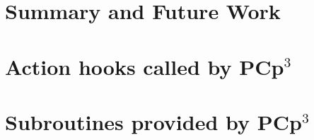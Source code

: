 \documentclass{article}
\newcommand{\pcp}{\mbox{\textsf{PCp}$^3$}}
\begin{document}
\section{Summary and Future Work}
\label{sec:summary}






\appendix
\newpage

\section{Action hooks called by \pcp}
\begin{footnotesize}
\label{sec:hooks}
\begin{itemize}
\sloppy

\fussy
\end{itemize}
\end{footnotesize}

\newpage

\section{Subroutines provided by \pcp}
\label{sec:backcalls}
\begin{footnotesize}
\begin{itemize}
\sloppy

\fussy
\end{itemize}
\end{footnotesize}

\newpage

\nocite{ARM}
\nocite{Dragon}
\nocite{Glickstein97} %
\nocite{Camel}        %
\nocite{Perl}        %
\nocite{Levine92}     %
\nocite{Harbison91}   %
\nocite{Stroustrup97} %
\nocite{Stroustrup94} %
\nocite{Kernighan88}  %
\nocite{Flanagan96}   %
\nocite{EmpCpp}
\nocite{EmpCpp-TR}
\nocite{GCC}
\nocite{CTree}
\nocite{TXL}
\nocite{Cordy92}
\nocite{Bison}
\nocite{Flex}
\nocite{Krone94}
\nocite{Griswold96}
\nocite{Atkinson96}
\nocite{CD2DraftStandard}



\end{document}
